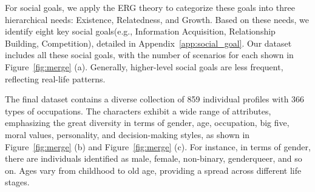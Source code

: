 For social goals, we apply the ERG theory \cite{ALDERFER1969142} to categorize these goals into three hierarchical needs: Existence, Relatedness, and Growth. Based on these needs, we identify eight key social goals(e.g., Information Acquisition, Relationship Building, Competition), detailed in Appendix~\ref{app:social_goal}.
Our dataset includes all these social goals, with the number of scenarios for each shown in Figure~\ref{fig:merge} (a). Generally, higher-level social goals are less frequent, reflecting real-life patterns.

The final dataset contains a diverse collection of 859 individual profiles with 366 types of occupations. The characters exhibit a wide range of attributes, emphasizing the great diversity in terms of gender, age, occupation, big five, moral values, personality, and decision-making styles, as shown in Figure~\ref{fig:merge} (b) and Figure~\ref{fig:merge} (c). For instance, in terms of gender, there are individuals identified as male, female, non-binary, genderqueer, and so on. Ages vary from childhood to old age, providing a spread across different life stages.
